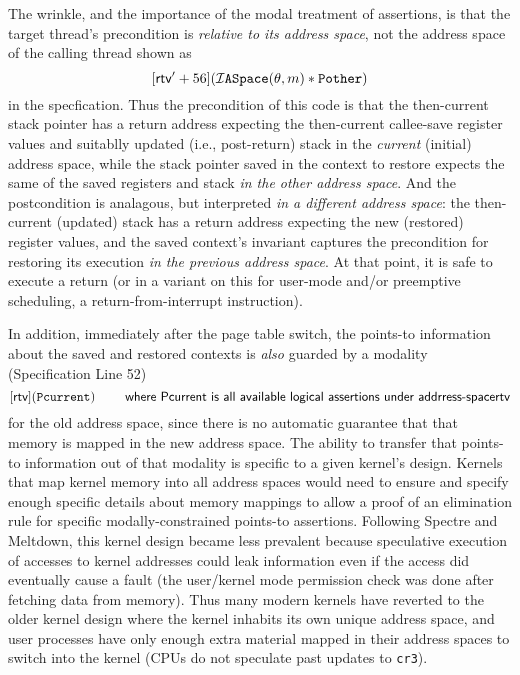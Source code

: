 The wrinkle, and the importance of the modal treatment of assertions, is that the target thread's precondition is \emph{relative to its address space}, not the address space of the calling thread shown as 
\[[\textsf{rtv}'+56](\mathcal{I}\texttt{ASpace}(\theta,m) \ast \texttt{Pother})\]
in the specfication. Thus the precondition of this code is that the then-current stack pointer has a return address expecting the then-current callee-save register values and suitablly updated (i.e., post-return) stack in the \emph{current} (initial) address space, while the stack pointer saved in the context to restore expects the same of the saved registers and stack \emph{in the other address space}. And the postcondition is analagous, but interpreted \emph{in a different address space}: the then-current (updated) stack has a return address expecting the new (restored) register values, and the saved context's invariant captures the precondition for restoring its execution \emph{in the previous address space}. At that point, it is safe to execute a return (or in a variant on this for user-mode and/or preemptive scheduling, a return-from-interrupt instruction).

In addition, immediately after the page table switch, the points-to information about the saved and restored contexts is \emph{also} guarded by a modality (Specification Line 52)
\[ [\textsf{rtv}](\texttt{Pcurrent}) \qquad \textsf{ where Pcurrent is all available logical assertions under addrress-space} \textsf{rtv}\]
for the old address space, since there is no automatic guarantee that that memory is mapped in the new address space.  The ability to transfer that points-to information out of that modality is specific to a given kernel's design. Kernels that map kernel memory into all address spaces would need to ensure and specify enough specific details about memory mappings to allow a proof of an elimination rule for specific modally-constrained points-to assertions.
Following Spectre and Meltdown, this kernel design became less prevalent because speculative execution of accesses to kernel addresses could leak information even if the access did eventually cause a fault (the user/kernel mode permission check was done after fetching data from memory). Thus many modern kernels have reverted to the older kernel design where the kernel inhabits its own unique address space, and user processes have only enough extra material mapped in their address spaces to switch into the kernel (CPUs do not speculate past updates to \texttt{cr3}).


